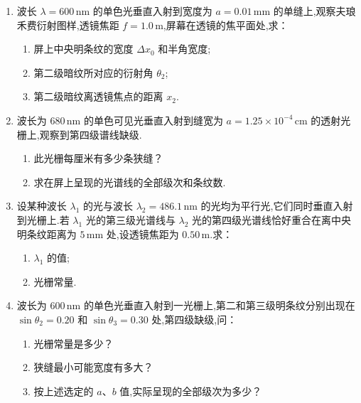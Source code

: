 \begin{enumerate}
	\item[\textbf{11-43}] 波长 $\lambda=600\,\mathrm{nm}$ 的单色光垂直入射到宽度为 $a=0.01\,\mathrm{mm}$ 的单缝上,观察夫琅禾费衍射图样,透镜焦距 $f=1.0\,\mathrm{m}$,屏幕在透镜的焦平面处,求：
	\begin{enumerate}
		\item 屏上中央明条纹的宽度 $\Delta x_0$ 和半角宽度;
		\item 第二级暗纹所对应的衍射角 $\theta_2$;
		\item 第二级暗纹离透镜焦点的距离 $x_2$.
	\end{enumerate}
	
	\vspace{5cm}

	\item[\textbf{11-44}] 波长为 $680\,\mathrm{nm}$ 的单色可见光垂直入射到缝宽为 $a=1.25\times10^{-4}\,\mathrm{cm}$ 的透射光栅上,观察到第四级谱线缺级.
	\begin{enumerate}
		\item 此光栅每厘米有多少条狭缝？
		\item 求在屏上呈现的光谱线的全部级次和条纹数.
	\end{enumerate}
	
	\vspace{5cm}

	\item[\textbf{11-45}] 设某种波长 $\lambda_1$ 的光与波长 $\lambda_2=486.1\,\mathrm{nm}$ 的光均为平行光,它们同时垂直入射到光栅上.若 $\lambda_1$ 光的第三级光谱线与 $\lambda_2$ 光的第四级光谱线恰好重合在离中央明条纹距离为 $5\,\mathrm{mm}$ 处,设透镜焦距为 $0.50\,\mathrm{m}$.求：
	\begin{enumerate}
		\item $\lambda_1$ 的值;
		\item 光栅常量.
	\end{enumerate}
	
	\vspace{12cm}

	\item[\textbf{11-47}] 波长为 $600\,\mathrm{nm}$ 的单色光垂直入射到一光栅上,第二和第三级明条纹分别出现在 $\sin\theta_2=0.20$ 和 $\sin\theta_3=0.30$ 处,第四级缺级,问：
	\begin{enumerate}
		\item 光栅常量是多少？
		\item 狭缝最小可能宽度有多大？
		\item 按上述选定的 $a$、$b$ 值,实际呈现的全部级次为多少？
	\end{enumerate}
	

\end{enumerate}
